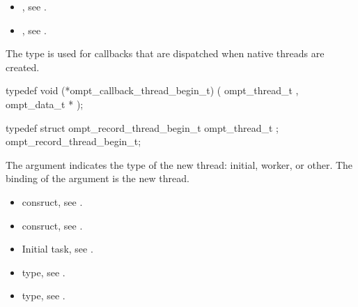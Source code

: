 \crossreferences
\begin{itemize}
\item {}, see .

\item {}, see .
\end{itemize}



\label{sec:ompt_callback_thread_begin_t}

\summary
The  type is used for callbacks
that are dispatched when native threads are created.

\format
\begin{ccppspecific}
\begin{omptCallback}
typedef void (*ompt_callback_thread_begin_t) (
  ompt_thread_t ,
  ompt_data_t *
);
\end{omptCallback}
\end{ccppspecific}

\record
\begin{ccppspecific}
\begin{omptRecord}
typedef struct ompt_record_thread_begin_t {
  ompt_thread_t ;
} ompt_record_thread_begin_t;
\end{omptRecord}
\end{ccppspecific}

\argdesc
The  argument indicates the type of the new thread: initial, 
worker, or other. The binding of the  argument is the new thread.

\crossreferences
\begin{itemize}
\item {} consruct, see .

\item {} consruct, see .

\item Initial task, see .

\item {} type, see .

\item {} type, see .
\end{itemize}



